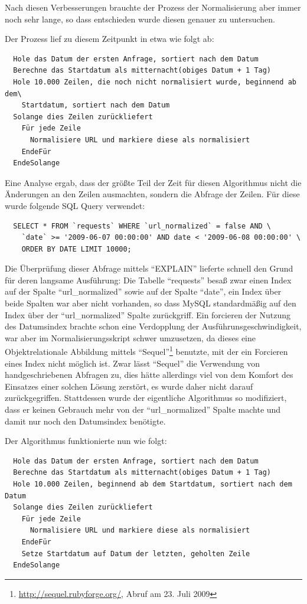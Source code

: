\documentclass[10pt]{scrartcl}
\begin{document}
Nach diesen Verbesserungen brauchte der Prozess der Normalisierung aber immer noch sehr lange, so dass entschieden wurde diesen genauer zu untersuchen.

Der Prozess lief zu diesem Zeitpunkt in etwa wie folgt ab:

\begin{verbatim}
  Hole das Datum der ersten Anfrage, sortiert nach dem Datum
  Berechne das Startdatum als mitternacht(obiges Datum + 1 Tag)
  Hole 10.000 Zeilen, die noch nicht normalisiert wurde, beginnend ab dem\  
    Startdatum, sortiert nach dem Datum
  Solange dies Zeilen zurückliefert
    Für jede Zeile
      Normalisiere URL und markiere diese als normalisiert 
    EndeFür
  EndeSolange
\end{verbatim}

Eine Analyse ergab, dass der größte Teil der Zeit für diesen Algorithmus nicht die Änderungen an den Zeilen ausmachten, sondern die Abfrage der Zeilen. Für diese wurde folgende SQL Query verwendet:

\begin{verbatim}
  SELECT * FROM `requests` WHERE `url_normalized` = false AND \
    `date` >= '2009-06-07 00:00:00' AND date < '2009-06-08 00:00:00' \
    ORDER BY DATE LIMIT 10000;
\end{verbatim}

Die Überprüfung dieser Abfrage mittels ``EXPLAIN'' lieferte schnell den Grund für deren langsame Ausführung: Die Tabelle ``requests'' besaß zwar einen Index auf der Spalte ``url\_normalized'' sowie auf der Spalte ``date'', ein Index über beide Spalten war aber nicht vorhanden, so dass MySQL standardmäßig auf den Index über der ``url\_normalized'' Spalte zurückgriff. Ein forcieren der Nutzung des Datumsindex brachte schon eine Verdopplung der Ausführunsgeschwindigkeit, war aber im Normalisierungsskript schwer umzusetzen, da dieses eine Objektrelationale Abbildung mittels ``Sequel''\footnote{\url{http://sequel.rubyforge.org/}, Abruf am 23. Juli 2009} benutzte, mit der ein Forcieren eines Index nicht möglich ist. Zwar lässt ``Sequel'' die Verwendung von handgeschriebenen Abfragen zu, dies hätte allerdings viel von dem Komfort des Einsatzes einer solchen Lösung zerstört, es wurde daher nicht darauf zurückgegriffen. Stattdessen wurde der eigentliche Algorithmus so modifiziert, dass er keinen Gebrauch mehr von der ``url\_normalized'' Spalte machte und damit nur noch den Datumsindex benötigte.

Der Algorithmus funktionierte nun wie folgt:
\begin{verbatim}
  Hole das Datum der ersten Anfrage, sortiert nach dem Datum
  Berechne das Startdatum als mitternacht(obiges Datum + 1 Tag)
  Hole 10.000 Zeilen, beginnend ab dem Startdatum, sortiert nach dem Datum
  Solange dies Zeilen zurückliefert
    Für jede Zeile
      Normalisiere URL und markiere diese als normalisiert 
    EndeFür
    Setze Startdatum auf Datum der letzten, geholten Zeile 
  EndeSolange
\end{verbatim}
\end{document}
